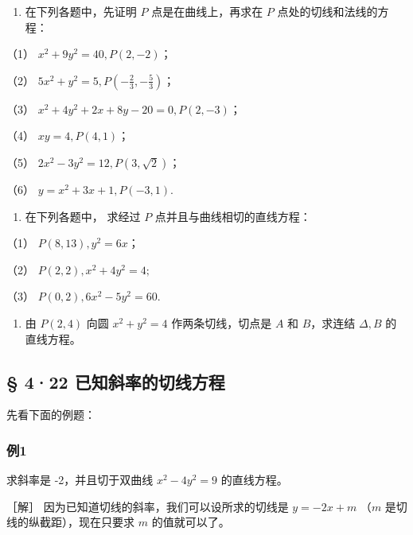 \begin{enumerate}
\def\labelenumi{\arabic{enumi}.}
\tightlist
\item
  在下列各题中，先证明 \(P\) 点是在曲线上，再求在 \(P\)
  点处的切线和法线的方程：
\end{enumerate}

（1） \(x^{2} + 9y^{2} = 40, P(2, -2)\)；

（2） \(5x^{2} + y^{2} = 5, P\left(-\frac{2}{3}, -\frac{5}{3}\right)\)；

（3） \(x^{2} + 4y^{2} + 2x + 8y - 20 = 0, P(2, -3)\)；

（4） \(xy = 4, P(4, 1)\)；

（5） \(2x^{2} - 3y^{2} = 12, P(3, \sqrt{2})\)；

（6） \(y = x^{2} + 3x + 1, P(-3, 1).\)

\begin{enumerate}
\def\labelenumi{\arabic{enumi}.}
\setcounter{enumi}{1}
\tightlist
\item
  在下列各题中， 求经过 \(P\) 点并且与曲线相切的直线方程：
\end{enumerate}

（1） \(P(8, 13), y^2 = 6x\)；

（2） \(P(2, 2), x^{2} + 4y^{2} = 4;\)

（3） \(P(0, 2), 6x^{2} - 5y^{2} = 60.\)

\begin{enumerate}
\def\labelenumi{\arabic{enumi}.}
\setcounter{enumi}{2}
\tightlist
\item
  由 \(P(2,4)\) 向圆 \(x^{2} + y^{2} = 4\) 作两条切线，切点是 \(A\) 和
  \(B\)，求连结 \(\Delta, B\) 的直线方程。
\end{enumerate}

\subsection{§ 4·22
已知斜率的切线方程}\label{ux5df2ux77e5ux659cux7387ux7684ux5207ux7ebfux65b9ux7a0b}

先看下面的例题：

\subsubsection{例1}\label{ux4f8b1-31}

求斜率是 -2，并且切于双曲线 \(x^{2}-4y^{2}=9\) 的直线方程。

［解］ 因为已知道切线的斜率，我们可以设所求的切线是 \(y = -2x + m\)
（\(m\) 是切线的纵截距），现在只要求 \(m\) 的值就可以了。

